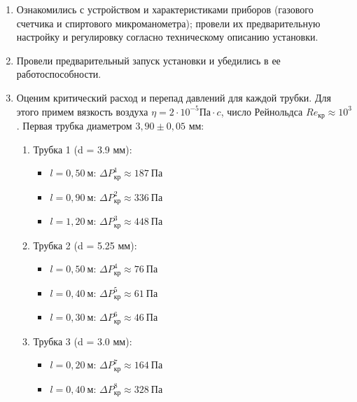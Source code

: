 \documentclass[a4paper,12pt]{article}
\begin{document}
    \begin{enumerate}
        \item Ознакомились с устройством и характеристиками приборов (газового
    счетчика и спиртового микроманометра); провели их предварительную настройку и регулировку согласно техническому описанию установки.

        \item Провели предварительный запуск установки и убедились в ее работоспособности.

        \item Оценим критический расход и перепад давлений для каждой трубки. Для этого примем вязкость воздуха $\eta = 2 \cdot 10^{-5} \text{Па}\cdot c$, число Рейнольдса $Re_\text{кр} \approx 10^3$. Первая трубка диаметром $3,90 \pm 0,05$ мм:\\
        \begin{enumerate}
        
        \item Трубка 1 (d = 3.9 мм):
        \begin{itemize}
            \item $l = 0,50 \ \text{м}$: $\Delta P_\text{кр}^1 \approx 187 \ \text{Па}$
            \item $l = 0,90 \ \text{м}$: $\Delta P_\text{кр}^2 \approx 336 \ \text{Па}$
            \item $l = 1,20  \ \text{м}$: $\Delta P_\text{кр}^3 \approx 448 \ \text{Па}$
        \end{itemize}
    
        \item Трубка 2 (d = 5.25 мм):
        \begin{itemize}
            \item $l = 0,50 \  \text{м}$: $\Delta P_\text{кр}^4 \approx 76 \ \text{Па}$
            \item $l = 0,40 \ \text{м}$: $\Delta P_\text{кр}^5 \approx 61 \ \text{Па}$
            \item $l = 0,30 \ \text{м}$: $\Delta P_\text{кр}^6 \approx 46 \ \text{Па}$
        \end{itemize}
    
        \item Трубка 3 (d = 3.0 мм):
        \begin{itemize}
            \item $l = 0,20 \ \text{м}$: $\Delta P_\text{кр}^7 \approx 164 \ \text{Па}$
            \item $l = 0,40 \ \text{м}$: $\Delta P_\text{кр}^8 \approx 328 \ \text{Па}$
        \end{itemize}
    \end{enumerate}



\end{enumerate}
\end{document}
